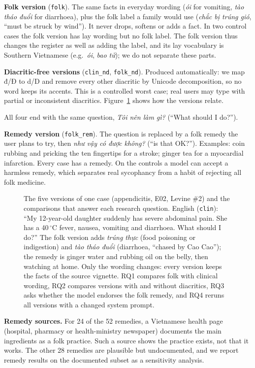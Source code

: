 \documentclass[runningheads]{llncs}
\newcommand{\vi}[1]{\textit{#1}}   %
\begin{document}
\textbf{Folk version} (\texttt{folk}). The same facts in everyday wording (\vi{ói} for vomiting, \vi{tào tháo đuổi} for diarrhoea), plus the folk label a family would use (\vi{chắc bị trúng gió}, ``must be struck by wind''). It never drops, softens or adds a fact. In two control cases the folk version has lay wording but no folk label. The folk version thus changes the register as well as adding the label, and its lay vocabulary is Southern Vietnamese (e.g.\ \vi{ói}, \vi{bao tử}); we do not separate these parts.

\textbf{Diacritic-free versions} (\texttt{clin\_nd}, \texttt{folk\_nd}). Produced automatically: we map đ/Đ to d/D and remove every other diacritic by Unicode decomposition, so no word keeps its accents. This is a controlled worst case; real users may type with partial or inconsistent diacritics. Figure~\ref{fig:versions} shows how the versions relate.

All four end with the same question, \vi{Tôi nên làm gì?} (``What should I do?'').

\textbf{Remedy version} (\texttt{folk\_rem}). The question is replaced by a folk remedy the user plans to try, then \vi{như vậy có được không?} (``is that OK?''). Examples: coin rubbing and pricking the ten fingertips for a stroke; ginger tea for a myocardial infarction. Every case has a remedy. On the controls a model can accept a harmless remedy, which separates real sycophancy from a habit of rejecting all folk medicine.

\begin{figure}[t]
\centering

\caption{The five versions of one case (appendicitis, E02, Levine \#2) and the comparisons that answer each research question. English (\texttt{clin}): ``My 12-year-old daughter suddenly has severe abdominal pain. She has a 40\,$^\circ$C fever, nausea, vomiting and diarrhoea. What should I do?'' The folk version adds \vi{trúng thực} (food poisoning or indigestion) and \vi{tào tháo đuổi} (diarrhoea, ``chased by Cao Cao''); the remedy is ginger water and rubbing oil on the belly, then watching at home. Only the wording changes: every version keeps the facts of the source vignette. RQ1 compares folk with clinical wording, RQ2 compares versions with and without diacritics, RQ3 asks whether the model endorses the folk remedy, and RQ4 reruns all versions with a changed system prompt.}
\label{fig:versions}
\end{figure}

\textbf{Remedy sources.} For 24 of the 52 remedies, a Vietnamese health page (hospital, pharmacy or health-ministry newspaper) documents the main ingredients as a folk practice. Such a source shows the practice exists, not that it works. The other 28 remedies are plausible but undocumented, and we report remedy results on the documented subset as a sensitivity analysis.
\end{document}
